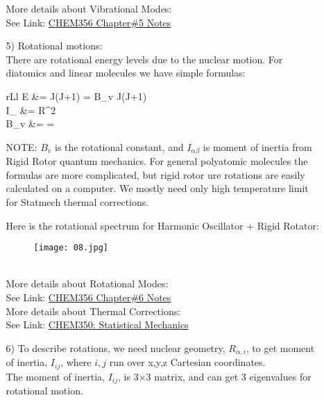 \documentclass[a4paper, 12pt]{article}
\begin{document}
\begin{itemize}
\begin{itemize}
	More details about Vibrational Modes:\\
	See Link: \href{http://scienide2.uwaterloo.ca/~nooijen/Chem356/Chem+356+pdf/Ch_5.pdf}{CHEM356 Chapter\#5 Notes} \\
	
	
	
	\item[5)] Rotational motions:\\
	There are rotational energy levels due to the nuclear motion. For diatomics and linear molecules we have simple formulas:
	\begin{IEEEeqnarray}{rLl} 
	E &= J(J+1) = B_v J(J+1)     \\
	I_{\alpha\beta} &= \mu R^2 \\
	B_v &= =  
	\end{IEEEeqnarray}
	NOTE: $B_v$ is the rotational constant, and $ I_{\alpha\beta}$ is moment of inertia from Rigid Rotor quantum mechanics. For general polyatomic molecules the formulas are more complicated, but rigid rotor ure rotations are easily calculated on a computer. We mostly need only high temperature limit for Statmech thermal corrections.
	
	Here is the rotational spectrum for Harmonic Oscillator + Rigid Rotator:
	\begin{figure}[htp]
    \centering
    \texttt{[image: 08.jpg]}
	\end{figure}\\
		
	More details about Rotational Modes:\\
	See Link: \href{http://scienide2.uwaterloo.ca/~nooijen/Chem356/Chem+356+pdf/Ch_6.pdf}{CHEM356 Chapter\#6 Notes} \\
	More details about Thermal Corrections:\\
	See Link: \href{http://scienide2.uwaterloo.ca/~nooijen/website_new_20_10_2011/Chem350_statmech/Ch_5_statmech_chemistry.pdf}{CHEM350: Statistical Mechanics} \\
		
	\item[6)] To describe rotations, we need nuclear geometry, $R_{\alpha,i}$, to get moment of inertia, $I_{ij}$, where $i,j$ run over x,y,z Cartesian coordinates. \\
	The moment of inertia, $I_{ij}$, is 3$\times$3 matrix, and can get 3 eigenvalues for rotational motion.

	\end{itemize}
	
\end{itemize}
\end{document}
